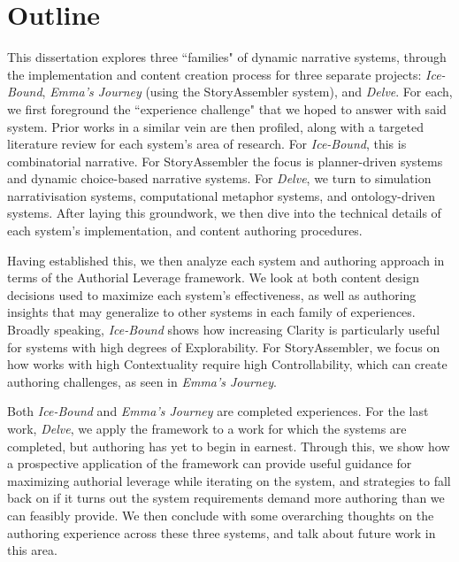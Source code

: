 \section{Outline}
This dissertation explores three ``families" of dynamic narrative systems, through the implementation and content creation process for three separate projects: \textit{Ice-Bound}, \textit{Emma's Journey} (using the StoryAssembler system), and \textit{Delve}. For each, we first foreground the ``experience challenge" that we hoped to answer with said system. Prior works in a similar vein are then profiled, along with a targeted literature review for each system's area of research. For \textit{Ice-Bound}, this is combinatorial narrative. For StoryAssembler the focus is planner-driven systems and dynamic choice-based narrative systems. For \textit{Delve}, we turn to simulation narrativisation systems, computational metaphor systems, and ontology-driven systems. After laying this groundwork, we then dive into the technical details of each system's implementation, and content authoring procedures. 

Having established this, we then analyze each system and authoring approach in terms of the Authorial Leverage framework. We look at both content design decisions used to maximize each system's effectiveness, as well as authoring insights that may generalize to other systems in each family of experiences. Broadly speaking, \textit{Ice-Bound} shows how increasing Clarity is particularly useful for systems with high degrees of Explorability. For StoryAssembler, we focus on how works with high Contextuality require high Controllability, which can create authoring challenges, as seen in \textit{Emma's Journey}. 

Both \textit{Ice-Bound} and \textit{Emma's Journey} are completed experiences. For the last work, \textit{Delve}, we apply the framework to a work for which the systems are completed, but authoring has yet to begin in earnest. Through this, we show how a prospective application of the framework can provide useful guidance for maximizing authorial leverage while iterating on the system, and strategies to fall back on if it turns out the system requirements demand more authoring than we can feasibly provide. We then conclude with some overarching thoughts on the authoring experience across these three systems, and talk about future work in this area.
